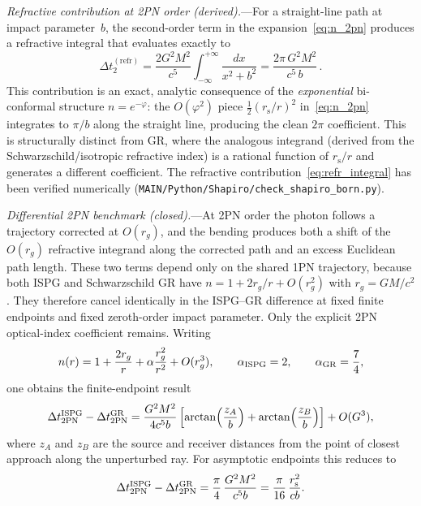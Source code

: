 \documentclass[aps,prd,onecolumn,superscriptaddress,nofootinbib,showpacs,12pt]{revtex4-2}
\newcommand{\rs}{r_{\mathrm{s}}}
\begin{document}
\textit{Refractive contribution at 2PN order (derived).}---For
a straight-line path at impact parameter~$b$, the second-order
term in the expansion~\eqref{eq:n_2pn} produces a refractive
integral that evaluates exactly to
\begin{equation}\label{eq:refr_integral}
  \Delta t_{2}^{(\mathrm{refr})}
    = \frac{2G^{2}M^{2}}{c^{5}}
      \int_{-\infty}^{+\infty}\!\frac{dx}{x^{2}+b^{2}}
    = \frac{2\pi\,G^{2}M^{2}}{c^{5}\,b}\,.
\end{equation}
This contribution is an exact, analytic consequence of the
\emph{exponential} bi-conformal structure
$n = e^{-\varphi}$: the $O(\varphi^{2})$ piece
$\tfrac{1}{2}(\rs/r)^{2}$ in~\eqref{eq:n_2pn} integrates to
$\pi/b$ along the straight line, producing the clean $2\pi$
coefficient.  This is structurally distinct from GR, where
the analogous integrand (derived from the
Schwarzschild/isotropic refractive index) is a rational
function of $\rs/r$ and generates a different coefficient.
The refractive contribution~\eqref{eq:refr_integral} has been
verified numerically (\texttt{MAIN/Python/Shapiro/check\_shapiro\_born.py}).

\textit{Differential 2PN benchmark (closed).}---At 2PN order
the photon follows a trajectory corrected at $O(r_{g})$, and
the bending produces both a shift of the $O(r_g)$ refractive
integrand along the corrected path and an excess Euclidean
path length.  These two terms depend only on the shared 1PN
trajectory, because both ISPG and Schwarzschild GR have
$n=1+2r_g/r+O(r_g^2)$ with $r_g=GM/c^2$.  They therefore
cancel identically in the ISPG--GR difference at fixed
finite endpoints and fixed zeroth-order impact parameter.
Only the explicit 2PN optical-index coefficient remains.
Writing
\[
  n(r)=1+\frac{2r_g}{r}
      +\alpha\frac{r_g^2}{r^2}+O(r_g^3),
  \qquad
  \alpha_{\rm ISPG}=2,\qquad
  \alpha_{\rm GR}=\frac{7}{4},
\]
one obtains the finite-endpoint result
\begin{equation}\label{eq:shapiro_delta_finite}
  \Delta t_{2{\rm PN}}^{\rm ISPG}
  -\Delta t_{2{\rm PN}}^{\rm GR}
  =
  \frac{G^2M^2}{4c^5 b}
  \left[
    \arctan\!\left(\frac{z_A}{b}\right)
    +\arctan\!\left(\frac{z_B}{b}\right)
  \right]
  +O(G^3),
\end{equation}
where $z_A$ and $z_B$ are the source and receiver distances
from the point of closest approach along the unperturbed ray.
For asymptotic endpoints this reduces to
\begin{equation}\label{eq:shapiro_delta_asymp}
  \Delta t_{2{\rm PN}}^{\rm ISPG}
  -\Delta t_{2{\rm PN}}^{\rm GR}
  =
  \frac{\pi}{4}\,\frac{G^2M^2}{c^5 b}
  =
  \frac{\pi}{16}\,\frac{\rs^2}{c b}.
\end{equation}
\end{document}
